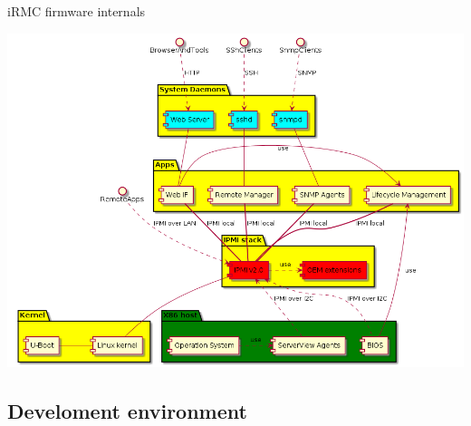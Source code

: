 \documentclass{beamer}
\begin{document}
  \begin{frame}{iRMC firmware internals}
	
	\includegraphics[width=\textwidth]{diagrams/irmc-components.png}

  \end{frame}

  \subsection{Develoment environment}
\end{document}
